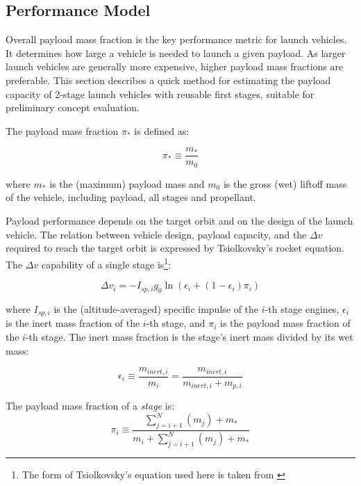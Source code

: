 \documentclass[conf]{new-aiaa}
\begin{document}
\begin{multicols}{2}
\section{Performance Model}

Overall payload mass fraction is the key performance metric for launch vehicles. It determines how large a vehicle is needed to launch a given payload. As larger launch vehicles are generally more expensive, higher payload mass fractions are preferable. This section describes a quick method for estimating the payload capacity of 2-stage launch vehicles with reusable first stages, suitable for preliminary concept evaluation.

The payload mass fraction $\pi_*$ is defined as:

\begin{equation}
\pi_* \equiv \frac{m_*}{m_0}
\end{equation}

where $m_*$ is the (maximum) payload mass and $m_0$ is the gross (wet) liftoff mass of the vehicle, including payload, all stages and propellant.

Payload performance depends on the target orbit and on the design of the launch vehicle. The relation between vehicle design, payload capacity, and the $\Delta v$ required to reach the target orbit is expressed by Tsiolkovsky’s rocket equation. The $\Delta v$ capability of a single stage is\footnote{The form of Tsiolkovsky's equation used here is taken from \cite{Wiesel2010}}:

\begin{equation}
\Delta v_i = - I_{sp,i} g_0 \ln \left( \epsilon_i + (1 - \epsilon_i) \pi_i \right)
\end{equation}

where $I_{sp,i}$ is the (altitude-averaged) specific impulse of the $i$-th stage engines, $\epsilon_i$ is the inert mass fraction of the $i$-th stage, and $\pi_i$ is the payload mass fraction of the $i$-th stage. The inert mass fraction is the stage's inert mass divided by its wet mass:

\begin{equation}
\epsilon_i \equiv \frac{m_{inert,i}}{m_i} = \frac{m_{inert,i}}{m_{inert,i} + m_{p,i}}
\end{equation}

The payload mass fraction of a \emph{stage} is:
\begin{equation}
\pi_i \equiv \frac{\sum_{j=i+1}^N (m_j) + m_*}{m_i + \sum_{j=i+1}^N (m_j) + m_*}
\end{equation}


\end{multicols}
\end{document}
